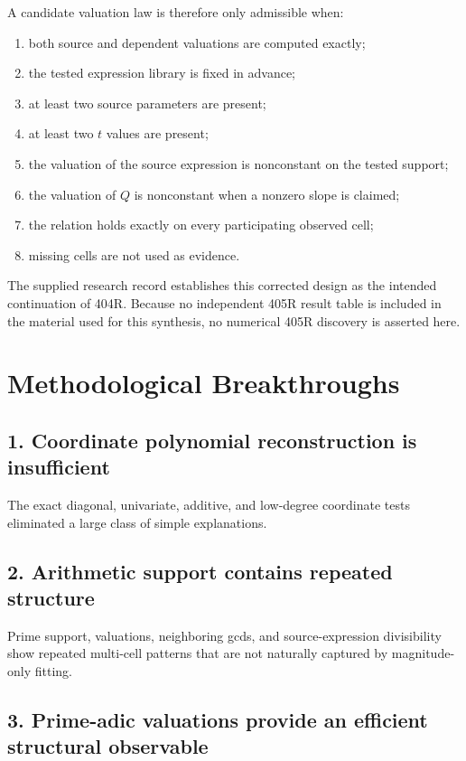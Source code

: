 \documentclass[11pt,a4paper]{article}
\begin{document}
A candidate valuation law is therefore only admissible when:
\begin{enumerate}[leftmargin=1.5em]
  \item both source and dependent valuations are computed exactly;
  \item the tested expression library is fixed in advance;
  \item at least two source parameters are present;
  \item at least two $t$ values are present;
  \item the valuation of the source expression is nonconstant on the tested support;
  \item the valuation of $Q$ is nonconstant when a nonzero slope is claimed;
  \item the relation holds exactly on every participating observed cell;
  \item missing cells are not used as evidence.
\end{enumerate}

The supplied research record establishes this corrected design as the intended continuation of 404R. Because no independent 405R result table is included in the material used for this synthesis, no numerical 405R discovery is asserted here.

\section{Methodological Breakthroughs}

\subsection{1. Coordinate polynomial reconstruction is insufficient}

The exact diagonal, univariate, additive, and low-degree coordinate tests eliminated a large class of simple explanations.

\subsection{2. Arithmetic support contains repeated structure}

Prime support, valuations, neighboring gcds, and source-expression divisibility show repeated multi-cell patterns that are not naturally captured by magnitude-only fitting.

\subsection{3. Prime-adic valuations provide an efficient structural observable}
\end{document}
